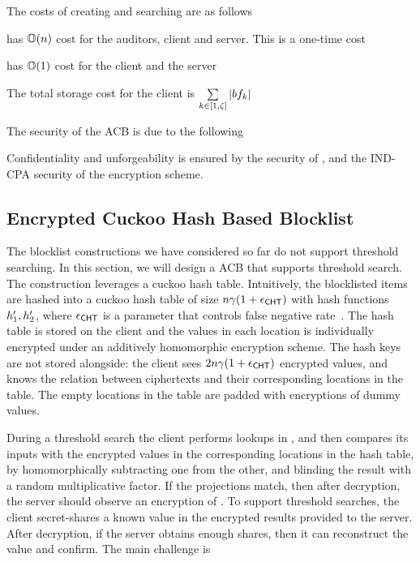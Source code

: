 %
The costs of creating and searching are as follows 

\itemListStart
\item \createBlocklist has $\mathbb{O}(n)$ cost for the auditors, client and server. This is a one-time cost
\item \searchBlocklist has $\mathbb{O}(1)$ cost for the client and the server
\item The total storage cost for the client is $\sum\limits_{\bloomFilterIdx \in [1, \numBins]} |\bloomFilter[\bloomFilterIdx]|$
\itemListEnd 


%
The security of the ACB is due to the following

\itemListStart
\item Confidentiality and unforgeability is ensured by the security of \authOPRFFunc, and the IND-CPA security of the encryption scheme. 
\itemListEnd


\subsection{Encrypted Cuckoo Hash Based Blocklist}
%
The blocklist constructions we have considered so far do not support threshold searching. In this section, we will design a ACB that supports threshold search. The construction leverages a cuckoo hash table. Intuitively, the blocklisted items are hashed into a cuckoo hash table \cuckooTable of size $n \gamma(1+\epsilon_{\mathsf{CHT}})$ with hash functions $\cuckooHashFn{1}, \cuckooHashFn{2}$, where $\epsilon_{\mathsf{CHT}}$ is a parameter that controls false negative rate~\cite{bhowmick2021apple}. The hash table is stored on the client and the values in each location is individually encrypted under an additively homomorphic encryption scheme. The hash keys are not stored alongside: the client sees $2 n \gamma(1+\epsilon_{\mathsf{CHT}})$ encrypted values, and knows the relation between ciphertexts and their corresponding locations in the table. The empty locations in the table are padded with encryptions of dummy values. 


During a threshold search the client performs lookups in \cuckooTable, and then compares its inputs with the encrypted values in the corresponding locations in the hash table, by homomorphically subtracting one from the other, and blinding the result with a random multiplicative factor. If the projections match, then after decryption, the server should observe an encryption of \groupIdentity. 
To support threshold searches, the client secret-shares a known value in the encrypted results provided to the server. After decryption, if the server obtains enough shares, then it can reconstruct the value and confirm. The main challenge is 

